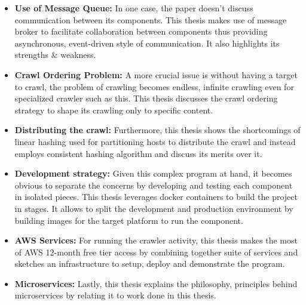 \begin{itemize}
  \item \textbf{Use of Message Queue:} In one case, the paper doesn't discuss communication between its components. This thesis makes use of message broker to facilitate collaboration between components thus providing asynchronous, event-driven style of communication. It also highlights its strengths \& weakness.
   \item \textbf{Crawl Ordering Problem:} A more crucial issue is without having a target to crawl, the problem of crawling becomes endless, infinite crawling even for specialized crawler such as this. This thesis discusses the crawl ordering strategy to shape its crawling only to specific content.
   \item \textbf{Distributing the crawl:} Furthermore, this thesis shows the shortcomings of linear hashing used for partitioning hosts to distribute the crawl and instead employs consistent hashing\cite{consisthash} algorithm and discuss its merits over it.
    \item \textbf{Development strategy:}  Given this complex program at hand, it becomes obvious to separate the concerns by developing and testing each component in isolated pieces. This thesis leverages docker containers to build the project in stages. It allows to split the development and production environment by building images for the target platform to run the component.
    \item \textbf{AWS Services:} For running the crawler activity, this thesis makes the most of AWS 12-month free tier access by combining together suite of services and sketches an infrastructure to setup, deploy and demonstrate the program.
    \item \textbf{Microservices:} Lastly, this thesis explains the philosophy, principles behind microservices \cite{microservices} by relating it to work done in this thesis.
\end{itemize}


